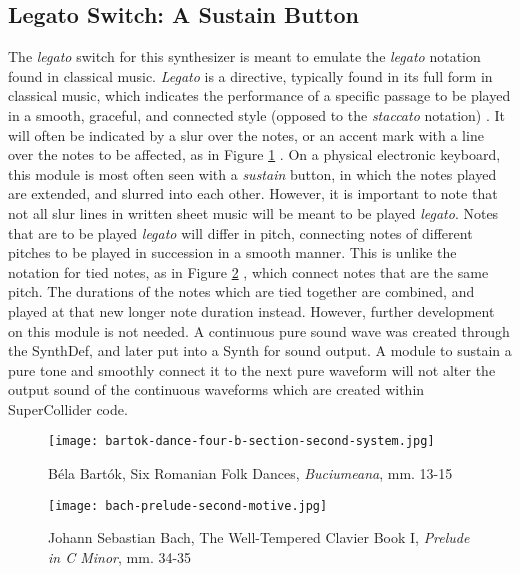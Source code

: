 \subsection{Legato Switch: A Sustain Button}

The \textit{legato} switch for this synthesizer is meant to emulate the \textit{legato} notation found in classical music. \textit{Legato} is a directive, typically found in its full form in classical music, which indicates the performance of a specific passage to be played in a smooth, graceful, and connected style (opposed to the \textit{staccato} notation) \cite{Winer_2018}. It will often be indicated by a slur over the notes, or an accent mark with a line over the notes to be affected, as in Figure \ref{fig:legato-notes-example} \cite{Henle_2009}. On a physical electronic keyboard, this module is most often seen with a \textit{sustain} button, in which the notes played are extended, and slurred into each other. However, it is important to note that not all slur lines in written sheet music will be meant to be played \textit{legato}. Notes that are to be played \textit{legato} will differ in pitch, connecting notes of different pitches to be played in succession in a smooth manner. This is unlike the notation for tied notes, as in Figure \ref{fig:tied-notes-example} \cite{Lung_2016}, which connect notes that are the same pitch. The durations of the notes which are tied together are combined, and played at that new longer note duration instead. However, further development on this module is not needed. A continuous pure sound wave was created through the SynthDef, and later put into a Synth for sound output. A module to sustain a pure tone and smoothly connect it to the next pure waveform will not alter the output sound of the continuous waveforms which are created within SuperCollider code.

\begin{figure}[h]
  \centering
  \texttt{[image: bartok-dance-four-b-section-second-system.jpg]}
  \caption{Béla Bartók, Six Romanian Folk Dances, \textit{Buciumeana},  mm. 13-15}
  \label{fig:legato-notes-example}
\end{figure}

\begin{figure}[h]
  \centering
  \texttt{[image: bach-prelude-second-motive.jpg]}
  \caption{Johann Sebastian Bach, The Well-Tempered Clavier Book I, \textit{Prelude in C Minor}, mm. 34-35}
  \label{fig:tied-notes-example}
\end{figure}

